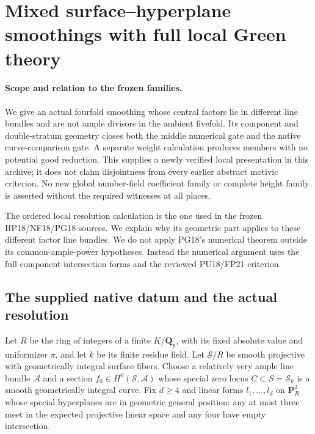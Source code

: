 \section{Mixed surface--hyperplane smoothings with full local Green theory}
\label{r21mx:section}

\paragraph{Scope and relation to the frozen families.}
We give an actual fourfold smoothing whose central factors lie in
different line bundles and are not ample divisors in the ambient
fivefold.  Its component and double-stratum geometry closes both the
middle numerical gate and the native curve-comparison gate.  A separate
weight calculation produces members with no potential good reduction.
This supplies a newly verified local presentation in this archive; it
does not claim disjointness from every earlier abstract motivic
criterion.  No new global number-field coefficient family or complete
height family is asserted without the required witnesses at all places.

The ordered local resolution calculation is the one used in the frozen
HP18/NF18/PG18 sources.  We explain why its geometric part applies to
these different factor line bundles.  We do not apply PG18's numerical
theorem outside its common-ample-power hypotheses.  Instead the
numerical argument uses the full component intersection forms and the
reviewed PU18/FP21 criterion.

\subsection{The supplied native datum and the actual resolution}

Let $R$ be the ring of integers of a finite $K/\mathbf Q_p$, with its
fixed absolute value and uniformizer $\pi$, and let $k$ be its finite
residue field.  Let $\mathcal S/R$ be smooth projective with
geometrically integral surface fibers.  Choose a relatively very ample
line bundle $\mathcal A$ and a section $f_0\in H^0(\mathcal S,\mathcal A)$
whose special zero locus $C\subset S=\mathcal S_k$ is a smooth
geometrically integral curve.  Fix $d\ge4$ and linear forms
$l_1,\ldots,l_d$ on $\mathbf P_R^3$ whose special hyperplanes are in
geometric general position: any at most three meet in the expected
projective linear space and any four have empty intersection.

